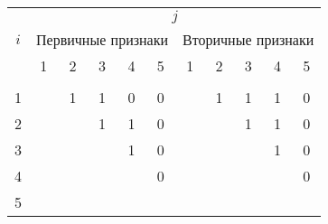\begin{multicols}{2}
\begin{table*}[b]
\begin{center}
\begin{tabular}{|c|c|c|c|c|c|c|c|c|c|c|}
\hline
 & \multicolumn{10}{c|}{$j$}\\
\cline{2-11}
$i$&\multicolumn{5}{c|}{Первичные признаки}&\multicolumn{5}{c|}{Вторичные признаки}\\
\cline{2-11}
& 1&2&3&4&5& 1&2&3&4&5\\
\multicolumn{1}{|p{20pt}|}{\hspace*{20pt}}&
\multicolumn{1}{p{20pt}|}{\hspace*{20pt}}&
\multicolumn{1}{p{20pt}|}{\hspace*{20pt}}&
\multicolumn{1}{p{20pt}|}{\hspace*{20pt}}&
\multicolumn{1}{p{20pt}|}{\hspace*{20pt}}&
\multicolumn{1}{p{20pt}|}{\hspace*{20pt}}&
\multicolumn{1}{p{20pt}|}{\hspace*{20pt}}&
\multicolumn{1}{p{20pt}|}{\hspace*{20pt}}&
\multicolumn{1}{p{20pt}|}{\hspace*{20pt}}&
\multicolumn{1}{p{20pt}|}{\hspace*{20pt}}&
\multicolumn{1}{p{20pt}|}{\hspace*{20pt}}\\[-12pt]
\hline
1&\cellcolor[gray]{.6}&1&1&0&0&\cellcolor[gray]{.6}&1&1&1&0\\
2&\cellcolor[gray]{.6}&\cellcolor[gray]{.6}&1&1&0&\cellcolor[gray]{.6}&\cellcolor[gray]{.6}&1&1&0\\
3&\cellcolor[gray]{.6}&\cellcolor[gray]{.6}&\cellcolor[gray]{.6}&1&0&\cellcolor[gray]{.6}&\cellcolor[gray]{.6}&\cellcolor[gray]{.6}&1&0\\
4&\cellcolor[gray]{.6}&\cellcolor[gray]{.6}&\cellcolor[gray]{.6}&\cellcolor[gray]{.6}&0&
\cellcolor[gray]{.6}&\cellcolor[gray]{.6}&\cellcolor[gray]{.6}&\cellcolor[gray]{.6}&0\\
5&\cellcolor[gray]{.6}&\cellcolor[gray]{.6}&\cellcolor[gray]{.6}&\cellcolor[gray]{.6}&
\cellcolor[gray]{.6}&\cellcolor[gray]{.6}&\cellcolor[gray]{.6}&\cellcolor[gray]{.6}&\cellcolor[gray]{.6}&\cellcolor[gray]{.6}\\
\hline
\end{tabular}
\end{center}
\end{table*}



\end{multicols}
